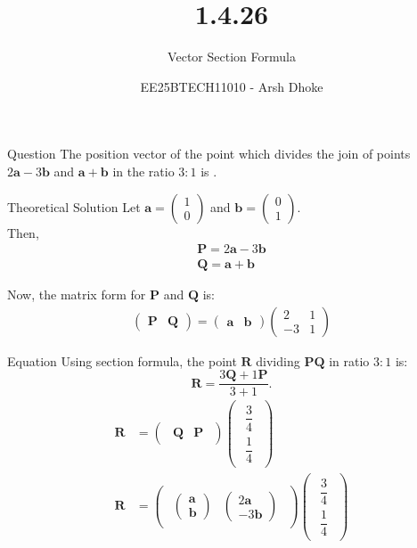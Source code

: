 \documentclass{beamer}
\title{1.4.26}
\subtitle{Vector Section Formula}
\author{EE25BTECH11010 - Arsh Dhoke}
\date{}
\renewcommand{\vec}[1]{\mathbf{#1}}
\newcommand{\brak}[1]{\begin{pmatrix}#1\end{pmatrix}}
\begin{document}
\begin{frame}
\titlepage
\end{frame}

\begin{frame}{Question}
The position vector of the point which divides the join of points 
$2\vec{a} - 3\vec{b}$ and $\vec{a} + \vec{b}$
in the ratio $3:1$ is \underline{\hspace{2cm}}.
\end{frame}

\begin{frame}{Theoretical Solution}
Let $\vec{a}=\brak{1\\0}$ and $\vec{b}=\brak{0\\1}$.\\
Then,
\begin{align*}
    \vec{P}=2\vec{a}-3\vec{b}\\
    \vec{Q}=\vec{a}+\vec{b}
\end{align*}

Now, the matrix form for \( \vec{P} \) and \( \vec{Q} \) is:
\begin{align}
\begin{pmatrix}
\vec{P} & \vec{Q}
\end{pmatrix}
= \begin{pmatrix}
\vec{a} & \vec{b}
\end{pmatrix}
\begin{pmatrix}
2 & 1 \\
-3 & 1
\end{pmatrix}
\end{align}
\end{frame}

\begin{frame}{Equation}
Using section formula, the point $\vec{R}$ dividing $\vec{PQ}$ in ratio $3:1$ is:
\[
\vec{R} = \frac{3\vec{Q} + 1\vec{P}}{3+1}.
\]
\begin{align*}
\vec{R} &= \brak{\begin{matrix} \vec{Q} & \vec{P} \end{matrix}}
\brak{\begin{matrix} \dfrac{3}{4} \\[6pt] \dfrac{1}{4} \end{matrix}} \\
\vec{R} &= \brak{\begin{matrix} 
\brak{\vec{a} \\ \vec{b}} & \brak{2\vec{a} \\ -3\vec{b}} 
\end{matrix}}
\brak{\begin{matrix} \dfrac{3}{4} \\[6pt] \dfrac{1}{4} \end{matrix}}
\end{align*}
\end{frame}
\end{document}
